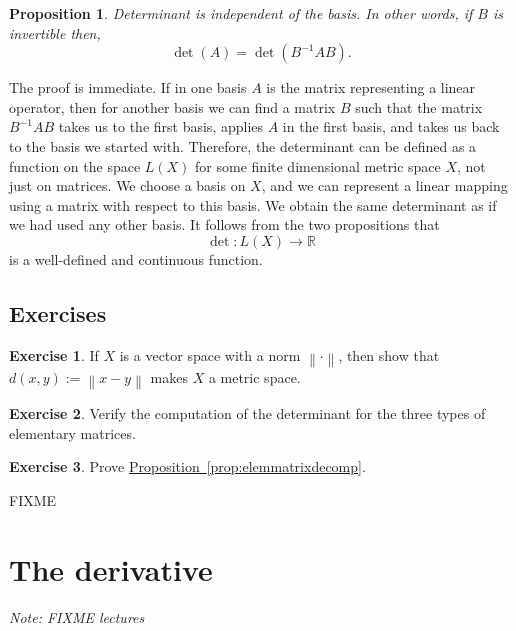 \documentclass[12pt]{book}
\newcommand{\norm}[1]{\left\lVert {#1} \right\rVert}
\newcommand{\R}{{\mathbb{R}}}
\newcommand{\sectionnotes}[1]{\noindent \emph{Note: #1} \medskip \par}
\newcommand{\sectionnewpage}{\clearpage}
\theoremstyle{plain}
\newtheorem{prop}[thm]{Proposition}
\theoremstyle{remark}
\theoremstyle{definition}
\theoremstyle{exercise}
\newtheorem{exercise}{Exercise}[section]
\theoremstyle{example}
\newcommand{\propref}[1]{\hyperref[#1]{Proposition~\ref*{#1}}}
\begin{document}
\begin{prop}
Determinant is independent of the basis.  In other words, if $B$ is invertible
then,
\begin{equation*}
\det(A) = \det(B^{-1}AB) .
\end{equation*}
\end{prop}

The proof is immediate.  If in one basis $A$ is the matrix representing a
linear operator, then for another basis we can find a matrix $B$ such
that the matrix $B^{-1}AB$ takes us to the first basis, applies $A$ in the
first basis, and takes us back to the basis we started with.
Therefore, the determinant can be defined as a function on the
space $L(X)$ for some finite dimensional metric space $X$, 
not just on matrices.
We choose a basis on $X$, and we can represent a linear mapping using
a matrix with respect to this basis.  We obtain the
same determinant as if we had used any other basis.
It follows from the two propositions that
\begin{equation*}
\det \colon L(X) \to \R
\end{equation*}
is a well-defined and continuous function.


\subsection{Exercises}

\begin{exercise}
If $X$ is a vector space with a norm $\norm{\cdot}$, then show that
$d(x,y) := \norm{x-y}$ makes $X$ a metric space.
\end{exercise}

\begin{exercise}
Verify the computation of the determinant for the three types of 
elementary matrices.
\end{exercise}

\begin{exercise}
Prove \propref{prop:elemmatrixdecomp}.
\end{exercise}

FIXME


\sectionnewpage
\section{The derivative}
\label{sec:svtheder}

\sectionnotes{FIXME lectures}
\end{document}
